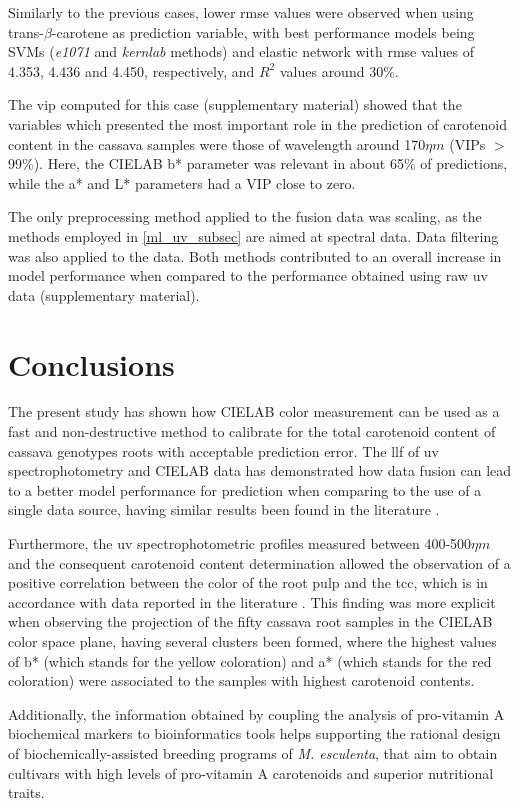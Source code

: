 Similarly to the previous cases, lower \gls{rmse} values were observed when using trans-$\beta$-carotene as prediction variable, with best performance models being SVMs (\textit{e1071} and \textit{kernlab} methods) and elastic network with \gls{rmse} values of 4.353, 4.436 and 4.450, respectively, and $R^{2}$ values around 30\%.

The \gls{vip} computed for this case (supplementary material) showed that the variables which presented the most important role in the prediction of carotenoid content in the cassava samples were those of wavelength around 170$\eta m$ (VIPs $>$ 99\%). Here, the CIELAB b* parameter was relevant in about 65\% of predictions, while the a* and L* parameters had a VIP close to zero.

The only preprocessing method applied to the fusion data was scaling, as the methods employed in \autoref{ml_uv_subsec} are aimed at spectral data. Data filtering was also applied to the data. Both methods contributed to an overall increase in model performance when compared to the performance obtained using raw \gls{uv} data (supplementary material).


\section{Conclusions} \label{conclusions}

The present study has shown how CIELAB color measurement can be used as a fast and non-destructive method to calibrate for the total carotenoid content of cassava genotypes roots with acceptable prediction error. The  \gls{llf} of \gls{uv} spectrophotometry and CIELAB data has demonstrated how data fusion can lead to a better model performance for prediction when comparing to the use of a single data source, having similar results been found in the literature \citep{botwey2014multi}.

Furthermore, the \gls{uv} spectrophotometric profiles measured between 400-500$\eta m$ and the consequent carotenoid content determination allowed the observation of a positive correlation between the color of the root pulp and the \gls{tcc}, which is in accordance with data reported in the literature \citep{champagne2010carotenoid, chavez2005variation, iglesias1997genetic}. This finding was more explicit when observing the projection of the fifty cassava root samples in the CIELAB color space plane, having several clusters been formed, where the highest values of b* (which stands for the yellow coloration) and a* (which stands for the red coloration) were associated to the samples with highest carotenoid contents.

Additionally, the information obtained by coupling the analysis of pro-vitamin A biochemical markers to bioinformatics tools helps supporting the rational design of biochemically-assisted breeding programs of \textit{M. esculenta}, that aim to obtain cultivars with high levels of pro-vitamin A carotenoids and superior nutritional traits.














